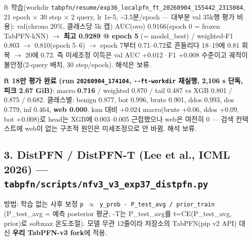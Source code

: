 \par\noindent \textbullet\enspace ft 학습(workdir \texttt{tabpfn/\allowbreak{}\allowbreak{}r\allowbreak{}esume/\allowbreak{}\allowbreak{}ex\allowbreak{}p36\_\allowbreak{}\allowbreak{}loca\allowbreak{}lpfn\_\allowbreak{}\allowbreak{}ft\_\allowbreak{}\allowbreak{}20260904\allowbreak{}\_\allowbreak{}\allowbreak{}155442\_\allowbreak{}\allowbreak{}2315084}, 21 epoch × 30 step × 2 query, lr 1e-5, \textasciitilde{}3.5분/\allowbreak{}epoch — 대부분 val 35k행 평가 비용): val(chrono 20\%, 클래스당 5k 캡) AUC(ovo) 0.9166(epoch 0 =\allowbreak{} frozen TabPFN-kNN)  \ensuremath{\rightarrow}  \textbf{최고 0.9289 @ epoch 5} (=\allowbreak{} model\_\allowbreak{}best) /\allowbreak{} weighted-F1 0.803  \ensuremath{\rightarrow}  0.810(epoch 5–6)  \ensuremath{\rightarrow}  epoch 7부터 0.71–0.72로 흔들리다 18–19에 0.81 회복  \ensuremath{\rightarrow}  20에 0.72. 즉 미세조정 이득은 val AUC +\allowbreak{}0.012·F1 +\allowbreak{}0.008 수준이고 궤적이 불안정(2-query 배치, 30 step/\allowbreak{}epoch). 해석은 보류.


\par\noindent \textbullet\enspace \textbf{ft 18만 평가 완료 (run \texttt{20260904\allowbreak{}\_\allowbreak{}\allowbreak{}174104}, \texttt{-\allowbreak{}-\allowbreak{}ft-\allowbreak{}wor\allowbreak{}kdir} 재실행, 2,106 s 단독, 피크 2.67 GiB)}: macro \textbf{0.716} /\allowbreak{} weighted 0.870 /\allowbreak{} tail 0.487 vs XGB 0.801 /\allowbreak{} 0.875 /\allowbreak{} 0.682. 클래스별: benign 0.877, bot 0.996, brute 0.901, ddos 0.993, dos 0.779, inf 0.464, \textbf{web 0.000}. knn 대비 +\allowbreak{}0.024 macro(brute +\allowbreak{}0.06, ddos +\allowbreak{}0.09, bot +\allowbreak{}0.008)로 head는 XGB에 0.003–0.005 근접했으나 web은 여전히 0 — 검색 컨텍스트에 web이 없는 구조적 원인은 미세조정으로 안 바뀜. 해석 보류.


\subsection{3. DistPFN /\allowbreak{} DistPFN-T (Lee et al., ICML 2026) — \texttt{tabpfn/\allowbreak{}\allowbreak{}s\allowbreak{}cripts/\allowbreak{}\allowbreak{}n\allowbreak{}fv3\_\allowbreak{}\allowbreak{}v3\_\allowbreak{}\allowbreak{}e\allowbreak{}xp37\_\allowbreak{}\allowbreak{}dis\allowbreak{}tpfn.\allowbreak{}py}}
방법: 학습 없는 사후 보정 \texttt{p \ensuremath{\propto} y\_\allowbreak{}\allowbreak{}pr\allowbreak{}ob · P\_\allowbreak{}\allowbreak{}t\allowbreak{}est\_\allowbreak{}\allowbreak{}avg \allowbreak{}/\allowbreak{}\allowbreak{} prior\_\allowbreak{}\allowbreak{}train} (P\_\allowbreak{}test\_\allowbreak{}avg =\allowbreak{} 예측 posterior 평균; -T는 P\_\allowbreak{}test\_\allowbreak{}avg를 τ=\allowbreak{}CE(P\_\allowbreak{}test\_\allowbreak{}avg, prior)로 softmax 온도조절). 모델 무관 12줄이라 저장소의 TabPFN(pip v2 API) 대신 \textbf{우리 TabPFN-v3 fork}에 적용.

